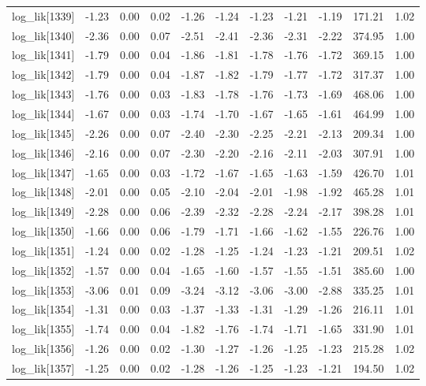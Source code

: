 \begin{table}[ht]
\begin{tabular}{rrrrrrrrrrr}
  log\_lik[1339] & -1.23 & 0.00 & 0.02 & -1.26 & -1.24 & -1.23 & -1.21 & -1.19 & 171.21 & 1.02 \\ 
  log\_lik[1340] & -2.36 & 0.00 & 0.07 & -2.51 & -2.41 & -2.36 & -2.31 & -2.22 & 374.95 & 1.00 \\ 
  log\_lik[1341] & -1.79 & 0.00 & 0.04 & -1.86 & -1.81 & -1.78 & -1.76 & -1.72 & 369.15 & 1.00 \\ 
  log\_lik[1342] & -1.79 & 0.00 & 0.04 & -1.87 & -1.82 & -1.79 & -1.77 & -1.72 & 317.37 & 1.00 \\ 
  log\_lik[1343] & -1.76 & 0.00 & 0.03 & -1.83 & -1.78 & -1.76 & -1.73 & -1.69 & 468.06 & 1.00 \\ 
  log\_lik[1344] & -1.67 & 0.00 & 0.03 & -1.74 & -1.70 & -1.67 & -1.65 & -1.61 & 464.99 & 1.00 \\ 
  log\_lik[1345] & -2.26 & 0.00 & 0.07 & -2.40 & -2.30 & -2.25 & -2.21 & -2.13 & 209.34 & 1.00 \\ 
  log\_lik[1346] & -2.16 & 0.00 & 0.07 & -2.30 & -2.20 & -2.16 & -2.11 & -2.03 & 307.91 & 1.00 \\ 
  log\_lik[1347] & -1.65 & 0.00 & 0.03 & -1.72 & -1.67 & -1.65 & -1.63 & -1.59 & 426.70 & 1.01 \\ 
  log\_lik[1348] & -2.01 & 0.00 & 0.05 & -2.10 & -2.04 & -2.01 & -1.98 & -1.92 & 465.28 & 1.01 \\ 
  log\_lik[1349] & -2.28 & 0.00 & 0.06 & -2.39 & -2.32 & -2.28 & -2.24 & -2.17 & 398.28 & 1.01 \\ 
  log\_lik[1350] & -1.66 & 0.00 & 0.06 & -1.79 & -1.71 & -1.66 & -1.62 & -1.55 & 226.76 & 1.00 \\ 
  log\_lik[1351] & -1.24 & 0.00 & 0.02 & -1.28 & -1.25 & -1.24 & -1.23 & -1.21 & 209.51 & 1.02 \\ 
  log\_lik[1352] & -1.57 & 0.00 & 0.04 & -1.65 & -1.60 & -1.57 & -1.55 & -1.51 & 385.60 & 1.00 \\ 
  log\_lik[1353] & -3.06 & 0.01 & 0.09 & -3.24 & -3.12 & -3.06 & -3.00 & -2.88 & 335.25 & 1.01 \\ 
  log\_lik[1354] & -1.31 & 0.00 & 0.03 & -1.37 & -1.33 & -1.31 & -1.29 & -1.26 & 216.11 & 1.01 \\ 
  log\_lik[1355] & -1.74 & 0.00 & 0.04 & -1.82 & -1.76 & -1.74 & -1.71 & -1.65 & 331.90 & 1.01 \\ 
  log\_lik[1356] & -1.26 & 0.00 & 0.02 & -1.30 & -1.27 & -1.26 & -1.25 & -1.23 & 215.28 & 1.02 \\ 
  log\_lik[1357] & -1.25 & 0.00 & 0.02 & -1.28 & -1.26 & -1.25 & -1.23 & -1.21 & 194.50 & 1.02 \\ 

\end{tabular}
\end{table}
